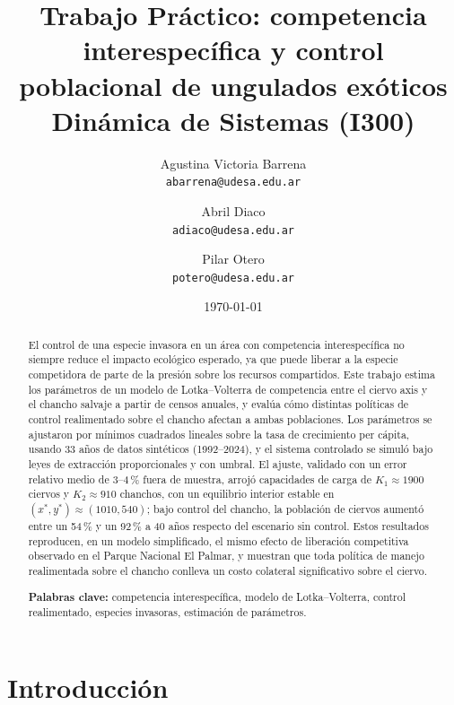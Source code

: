 \documentclass[11pt,a4paper]{article}
\title{\textbf{Trabajo Práctico: competencia interespecífica y control
poblacional de ungulados exóticos}\\[2pt]
       \large Dinámica de Sistemas (I300)}
\author{Agustina Victoria Barrena\\
        \small \texttt{abarrena@udesa.edu.ar}
        \and
        Abril Diaco\\
        \small \texttt{adiaco@udesa.edu.ar}
        \and
        Pilar Otero\\
        \small \texttt{potero@udesa.edu.ar}}
\date{\today}
\newif\ifguias
\newcommand{\guia}[1]{\ifguias\par\noindent
  {\color{gray!85!black}\small\itshape #1}\par\medskip\fi}
\begin{document}
\maketitle

\begin{abstract}
\guia{El resumen tiene entre 150 y 200 palabras y se escribe AL FINAL.
Cinco oraciones alcanzan: (1) contexto y problema; (2) objetivo concreto
de este trabajo; (3) qué se hizo (datos y método, en una línea);
(4) el resultado principal CON NÚMEROS; (5) qué se concluye.
No lleva citas, ni figuras, ni siglas sin definir. Escribir sólo
``en este trabajo se estudia\dots'' no sirve: eso no dice cuál fue el
resultado.}

El control de una especie invasora en un área con competencia interespecífica no
siempre reduce el impacto ecológico esperado, ya que puede liberar a la especie
competidora de parte de la presión sobre los recursos compartidos. Este trabajo
estima los parámetros de un modelo de Lotka--Volterra de competencia entre el ciervo
axis y el chancho salvaje a partir de censos anuales, y evalúa cómo distintas
políticas de control realimentado sobre el chancho afectan a ambas poblaciones. Los
parámetros se ajustaron por mínimos cuadrados lineales sobre la tasa de crecimiento
per cápita, usando 33 años de datos sintéticos (1992--2024), y el sistema controlado
se simuló bajo leyes de extracción proporcionales y con umbral. El ajuste, validado
con un error relativo medio de 3--4\,\% fuera de muestra, arrojó capacidades de carga
de $K_1\approx1900$ ciervos y $K_2\approx910$ chanchos, con un equilibrio interior
estable en $(x^*,y^*)\approx(1010,540)$; bajo control del chancho, la población de
ciervos aumentó entre un 54\,\% y un 92\,\% a 40 años respecto del escenario sin
control. Estos resultados reproducen, en un modelo simplificado, el mismo efecto de
liberación competitiva observado en el Parque Nacional El Palmar, y muestran que toda
política de manejo realimentada sobre el chancho conlleva un costo colateral
significativo sobre el ciervo.


\medskip
\noindent\textbf{Palabras clave:} competencia interespecífica, modelo de Lotka--Volterra, control realimentado, especies invasoras, estimación de parámetros.

\end{abstract}

\section{Introducción}
\label{sec:intro}
\end{document}
